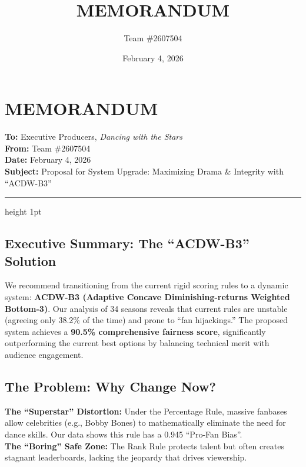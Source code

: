 \documentclass{article}
\title{MEMORANDUM}
\author{Team \#2607504}
\date{February 4, 2026}
\begin{document}
\section*{MEMORANDUM}
\noindent\textbf{To:} Executive Producers, \emph{Dancing with the Stars}\\
\textbf{From:} Team \#2607504\\
\textbf{Date:} February 4, 2026\\
\textbf{Subject:} Proposal for System Upgrade: Maximizing Drama \& Integrity with ``ACDW-B3''

\hrule height 1pt
\vspace{1em}

\subsection*{Executive Summary: The ``ACDW-B3'' Solution}
We recommend transitioning from the current rigid scoring rules to a dynamic system:
\textbf{ACDW-B3 (Adaptive Concave Diminishing-returns Weighted Bottom-3)}.
Our analysis of 34 seasons reveals that current rules are unstable (agreeing only 38.2\% of the time) and prone to ``fan hijackings.'' The proposed system achieves a \textbf{90.5\% comprehensive fairness score}, significantly outperforming the current best options by balancing technical merit with audience engagement.

\vspace{-0.5em}

\subsection*{The Problem: Why Change Now?}
\noindent\textbf{The ``Superstar'' Distortion:} Under the Percentage Rule, massive fanbases allow celebrities (e.g., Bobby Bones) to mathematically eliminate the need for dance skills. Our data shows this rule has a 0.945 ``Pro-Fan Bias''.\\
\textbf{The ``Boring'' Safe Zone:} The Rank Rule protects talent but often creates stagnant leaderboards, lacking the jeopardy that drives viewership.

\vspace{-0.5em}
\end{document}
